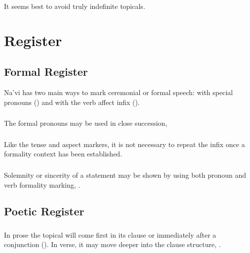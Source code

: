 \noindent It seems best to avoid truly indefinite topicals.


\section{Register}

\subsection{Formal Register} Na'vi has two main ways to mark
ceremonial or formal speech: with special pronouns
() and with the verb affect infix
 ().

\subsubsection{} The formal pronouns may be used in close succession,
 

\subsubsection{} Like the tense and aspect markers, it is not
necessary to repeat the infix  once a formality context
has been established.

\subsubsection{} Solemnity or sincerity of a statement may be shown by
using both pronoun and verb formality marking,  .


\subsection{Poetic Register}

\subsubsection{} In prose the topical will come first in its clause or
immediately after a conjunction ().
In verse, it may move deeper into the clause structure,
 .

